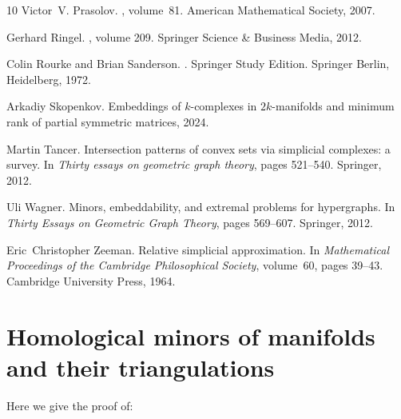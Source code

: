 \documentclass[a4paper,UKenglish,thm-restate]{article}
\begin{document}
\begin{thebibliography}{10}
Victor~V. Prasolov.
, volume~81.
\newblock American Mathematical Society, 2007.

Gerhard Ringel.
, volume 209.
\newblock Springer Science \& Business Media, 2012.

Colin Rourke and Brian Sanderson.
.
\newblock Springer Study Edition. Springer Berlin, Heidelberg, 1972.

Arkadiy Skopenkov.
\newblock Embeddings of $k$-complexes in $2k$-manifolds and minimum rank of
  partial symmetric matrices, 2024.

Martin Tancer.
\newblock Intersection patterns of convex sets via simplicial complexes: a
  survey.
\newblock In {\em Thirty essays on geometric graph theory}, pages 521--540.
  Springer, 2012.

Uli Wagner.
\newblock Minors, embeddability, and extremal problems for hypergraphs.
\newblock In {\em Thirty Essays on Geometric Graph Theory}, pages 569--607.
  Springer, 2012.

Eric~Christopher Zeeman.
\newblock Relative simplicial approximation.
\newblock In {\em Mathematical Proceedings of the Cambridge Philosophical
  Society}, volume~60, pages 39--43. Cambridge University Press, 1964.

\end{thebibliography}



\appendix

\section{Homological minors of manifolds and their triangulations}\label{app:simpapp}

Here we give the proof of:
\end{document}
